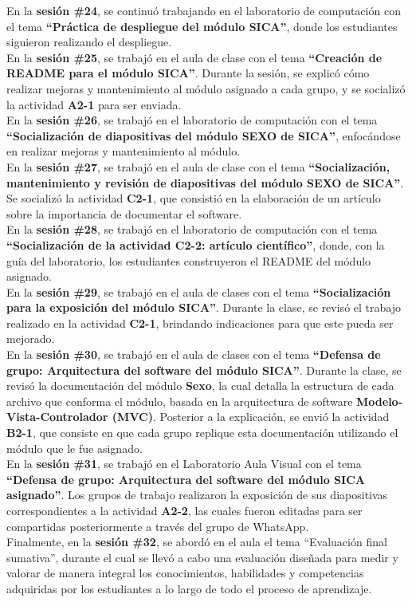 \documentclass[12pt]{article}
\begin{document}
\begin{multicols}{2}
En la \textbf{sesión \#24}, se continuó trabajando en el laboratorio de computación con el tema \textbf{``Práctica de despliegue del módulo SICA''}, donde los estudiantes siguieron realizando el despliegue.\\
En la \textbf{sesión \#25}, se trabajó en el aula de clase con el tema \textbf{``Creación de README para el módulo SICA''}. Durante la sesión, se explicó cómo realizar mejoras y mantenimiento al módulo asignado a cada grupo, y se socializó la actividad \textbf{A2-1} para ser enviada.\\
En la \textbf{sesión \#26}, se trabajó en el laboratorio de computación con el tema \textbf{``Socialización de diapositivas del módulo SEXO de SICA''}, enfocándose en realizar mejoras y mantenimiento al módulo.\\
En la \textbf{sesión \#27}, se trabajó en el aula de clase con el tema \textbf{``Socialización, mantenimiento y revisión de diapositivas del módulo SEXO de SICA''}. Se socializó la actividad \textbf{C2-1}, que consistió en la elaboración de un artículo sobre la importancia de documentar el software.\\
En la \textbf{sesión \#28}, se trabajó en el laboratorio de computación con el tema \textbf{``Socialización de la actividad C2-2: artículo científico''}, donde, con la guía del laboratorio, los estudiantes construyeron el README del módulo asignado.\\
En la \textbf{sesión \#29}, se trabajó en el aula de clases con el tema \textbf{``Socialización para la exposición del módulo SICA''}. Durante la clase, se revisó el trabajo realizado en la actividad \textbf{C2-1}, brindando indicaciones para que este pueda ser mejorado.\\
En la \textbf{sesión \#30}, se trabajó en el aula de clases con el tema \textbf{``Defensa de grupo: Arquitectura del software del módulo SICA''}. Durante la clase, se revisó la documentación del módulo \textbf{Sexo}, la cual detalla la estructura de cada archivo que conforma el módulo, basada en la arquitectura de software \textbf{Modelo-Vista-Controlador (MVC)}. Posterior a la explicación, se envió la actividad \textbf{B2-1}, que consiste en que cada grupo replique esta documentación utilizando el módulo que le fue asignado.\\
En la \textbf{sesión \#31}, se trabajó en el Laboratorio Aula Visual con el tema \textbf{``Defensa de grupo: Arquitectura del software del módulo SICA asignado''}. Los grupos de trabajo realizaron la exposición de sus diapositivas correspondientes a la actividad \textbf{A2-2}, las cuales fueron editadas para ser compartidas posteriormente a través del grupo de WhatsApp.\\
Finalmente, en la \textbf{sesión \#32}, se abordó en el aula el tema “Evaluación final sumativa”, durante el cual se llevó a cabo una evaluación diseñada para medir y valorar de manera integral los conocimientos, habilidades y competencias adquiridas por los estudiantes a lo largo de todo el proceso de aprendizaje.


\end{multicols}
\end{document}
